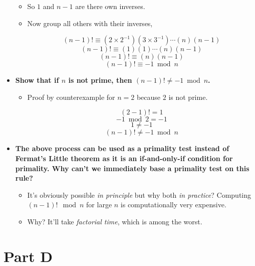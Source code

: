 \documentclass[11pt]{article}
\begin{document}
\begin{itemize}
\begin{itemize}
\item So $1$ and $n - 1$ are there own inverses.

\item Now group all others with their inverses,

$$ (n - 1)! \equiv (2 \times 2^{-1})(3 \times 3^{-1}) \cdots (n)(n - 1) $$
$$ (n - 1)! \equiv (1)(1) \cdots (n)(n - 1) $$
$$ (n - 1)! \equiv (n)(n - 1) $$
$$ (n - 1)! \equiv -1 \bmod n $$

\end{itemize}
  

\item \textbf{Show that if $n$ is not prime, then $(n-1)! \neq -1 \bmod
  n$.}

\begin{itemize}

\item Proof by counterexample for $n = 2$ because $2$ is not prime.

$$ (2 - 1)! = 1 $$
$$ -1 \bmod 2 = -1 $$
$$ 1 \ne -1 $$
$$ (n-1)! \ne -1 \bmod
  n $$

\end{itemize}

\item \textbf{The above process can be used as a primality test instead of
  Fermat's Little theorem as it is an if-and-only-if condition for
  primality. Why can't we immediately base a primality test on this
  rule?}
  
\begin{itemize}

\item It's obviously possible \emph{in principle} but why both \emph{in practice}? Computing $(n - 1)! \mod n$ for large $n$ is computationally very expensive.

\item Why? It'll take \emph{factorial time}, which is among the worst.

\end{itemize}  

\end{itemize}

\section*{Part D}
\end{document}
